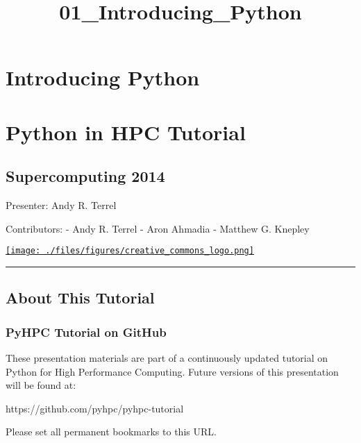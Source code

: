 \documentclass{article}
\title{01\_Introducing\_Python}
\begin{document}
    
    
    \maketitle
    
    

    
    \section{Introducing Python}\label{introducing-python}

\section{Python in HPC Tutorial}\label{python-in-hpc-tutorial}

\subsection{Supercomputing 2014}\label{supercomputing-2014}

Presenter: Andy R. Terrel

Contributors: - Andy R. Terrel - Aron Ahmadia - Matthew G. Knepley

\href{http://creativecommons.org/licenses/by/3.0/deed.en_US}{\texttt{[image: ./files/figures/creative\_commons\_logo.png]}}

    \begin{center}\rule{3in}{0.4pt}\end{center}

\subsection{About This Tutorial}\label{about-this-tutorial}

\subsubsection{PyHPC Tutorial on GitHub}\label{pyhpc-tutorial-on-github}

These presentation materials are part of a continuously updated tutorial
on Python for High Performance Computing. Future versions of this
presentation will be found at:

https://github.com/pyhpc/pyhpc-tutorial

Please set all permanent bookmarks to this URL.

\subsubsection{}\label{section}
\end{document}
